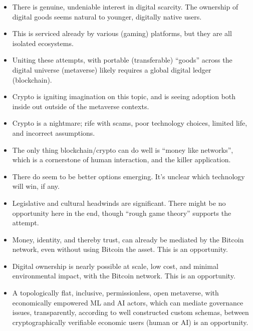 {\begin{itemize}
\item There is genuine, undeniable interest in digital scarcity. The ownership of digital goods seems natural to younger, digitally native users.
\item This is serviced already by various (gaming) platforms, but they are all isolated ecosystems.
\item Uniting these attempts, with portable (transferable) ``goods'' across the digital universe (metaverse) likely requires a global digital ledger (blockchain).
\item Crypto is igniting imagination on this topic, and is seeing adoption both inside out outside of the metaverse contexts.
\item Crypto is a nightmare; rife with scams, poor technology choices, limited life, and incorrect assumptions.
\item The only thing blockchain/crypto can do well is ``money like networks'', which is a cornerstone of human interaction, and the killer application.
\item There do seem to be better options emerging. It's unclear which technology will win, if any.
\item Legislative and cultural headwinds are significant. There might be no opportunity here in the end, though ``rough game theory'' supports the attempt.
\item Money, identity, and thereby trust, can already be mediated by the Bitcoin network, even without using Bitcoin the asset. This is an opportunity.
\item Digital ownership is nearly possible at scale, low cost, and minimal environmental impact, with the Bitcoin network. This is an opportunity.
\item A topologically flat, inclusive, permissionless, open metaverse, with economically empowered ML and AI actors, which can mediate governance issues, transparently, according to well constructed custom schemas, between cryptographically verifiable economic users (human or AI) is an opportunity.
\end{itemize}
}
